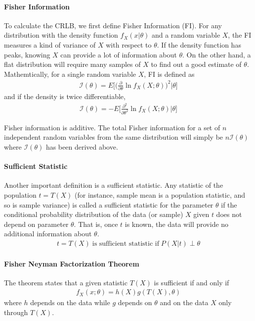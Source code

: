 \documentclass[../probability-notes.tex]{subfiles}
\begin{document}
    \paragraph{Fisher Information} To calculate the CRLB, we first define Fisher Information (FI). For any distribution with the density function $f_{X}(x \vert \theta)$ and a random variable $X$, the FI measures a kind of variance of $X$ with respect to $\theta$. If the density function has peaks, knowing $X$ can provide a lot of information about $\theta$. On the other hand, a flat distribution will require many samples of $X$ to find out a good estimate of $\theta$. Mathemtically, for a single random variable $X$, FI is defined as
    \begin{align*}
        \mathcal{I}(\theta) = E \bigg[ \bigg(\frac{\partial}{\partial \theta} \ln f_{X}(X; \theta)\bigg)^{2} \bigg \vert \theta \bigg]
    \end{align*}
    and if the density is twice differentiable,
    \begin{align*}
        \mathcal{I}(\theta) = -E \bigg[ \frac{\partial^{2}}{\partial \theta^{2}} \ln f_{X}(X; \theta) \bigg \vert \theta \bigg]
    \end{align*}

    Fisher information is additive. The total Fisher information for a set of $n$ independent random variables from the same distribution will simply be $n\mathcal{I}(\theta)$ where $\mathcal{I}(\theta)$ has been derived above.

    \paragraph{Sufficient Statistic} Another important definition is a sufficient statistic. Any statistic of the population $t = T(X)$ (for instance, sample mean is a population statistic, and so is sample variance) is called a sufficient statistic for the parameter $\theta$ if the conditional probability distribution of the data (or sample) $X$ given $t$ does not depend on parameter $\theta$. That is, once $t$ is known, the data will provide no additional information about $\theta$.
    \begin{align*}
        t = T(X) \; \text{is sufficient statistic if} \; P(X \vert t) \perp \theta
    \end{align*}

    \paragraph{Fisher Neyman Factorization Theorem} The theorem states that a given statistic $T(X)$ is sufficient if and only if
    \begin{align*}
        f_{X}(x;\theta) = h(X)g(T(X), \theta)
    \end{align*}
    where $h$ depends on the data while $g$ depends on $\theta$ and on the data $X$ only through $T(X)$.
\end{document}
